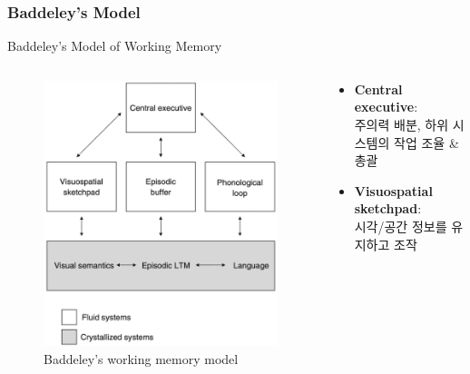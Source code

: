 \documentclass{beamer}
\begin{document}
\subsubsection{Baddeley's Model}
\begin{frame}{Baddeley's Model of Working Memory}
  \begin{columns}
    \begin{column}{0.38\textwidth}
      \centering
      \begin{figure}
        \centering
        \includegraphics[width=\textwidth]{image/baddeley_model}
        \caption{Baddeley’s working memory model}
      \end{figure}
    \end{column}
    \hfill
    \hspace{-5em}
    \begin{column}{0.62\textwidth}
      \vspace{-2em}
      \large
      \begin{itemize}
        \item \textbf{Central executive}: \\주의력 배분, 하위 시스템의 작업 조율 \& 총괄
        \item \textbf{Visuospatial sketchpad}: \\시각/공간 정보를 유지하고 조작

\end{itemize}
\end{column}
\end{columns}
\end{frame}
\end{document}
